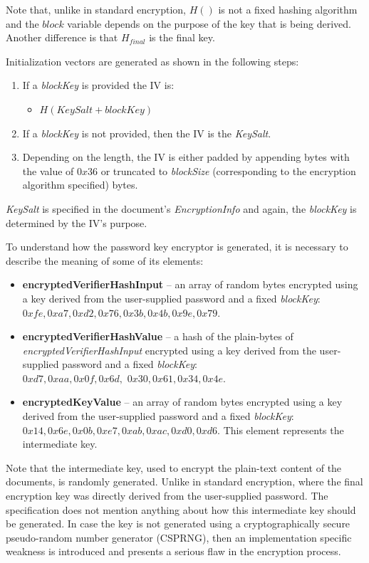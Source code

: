 \documentclass[11pt,oneside]{fithesis2}
\begin{document}
Note that, unlike in standard encryption, $H()$ is not a fixed hashing algorithm and the $block$ variable depends on the purpose of the key that is being derived. Another difference is that $H_{final}$ is the final key.

Initialization vectors are generated as shown in the following steps:
\begin{enumerate}\label{IVgen}
	\item{If a \textit{blockKey} is provided the IV is:}
	\begin{itemize}
		\item{$H(KeySalt + blockKey)$}
	\end{itemize}
	\item{If a \textit{blockKey} is not provided, then the IV is the \textit{KeySalt}.}
	\item{Depending on the length, the IV is either padded by appending bytes with the value of $0x36$ or truncated to \textit{blockSize} (corresponding to the encryption algorithm specified) bytes.}
\end{enumerate}

\textit{KeySalt} is specified in the document's \textit{EncryptionInfo} and again, the \textit{blockKey} is determined by the IV's purpose.

To understand how the password key encryptor is generated, it is necessary to describe the meaning of some of its elements:

\begin{itemize}
\setlength\itemsep{0.1em}
	\item{\textbf{encryptedVerifierHashInput} -- an array of random bytes encrypted using a key derived from the user-supplied password and a fixed \textit{blockKey}: $0xfe, 0xa7, 0xd2, 0x76, 0x3b, 0x4b, 0x9e, 0x79$.} 
	\item{\textbf{encryptedVerifierHashValue} -- a hash of the plain-bytes of \textit{encryptedVerifierHashInput} encrypted using a key derived from the user-supplied password and a fixed \textit{blockKey}:\\ $0xd7, 0xaa, 0x0f, 0x6d,$ $0x30, 0x61, 0x34, 0x4e$.}
	\item{\textbf{encryptedKeyValue} -- an array of random bytes encrypted using a key derived from the user-supplied password and a fixed \textit{blockKey}: $0x14, 0x6e, 0x0b, 0xe7, 0xab, 0xac, 0xd0, 0xd6$. This element represents the intermediate key.}
\end{itemize}

Note that the intermediate key, used to encrypt the plain-text content of the documents, is randomly generated. Unlike in standard encryption, where the final encryption key was directly derived from the user-supplied password. The specification does not mention anything about how this intermediate key should be generated. In case the key is not generated using a cryptographically secure pseudo-random number generator (CSPRNG), then an implementation specific weakness is introduced and presents a serious flaw in the encryption process. 
\end{document}
